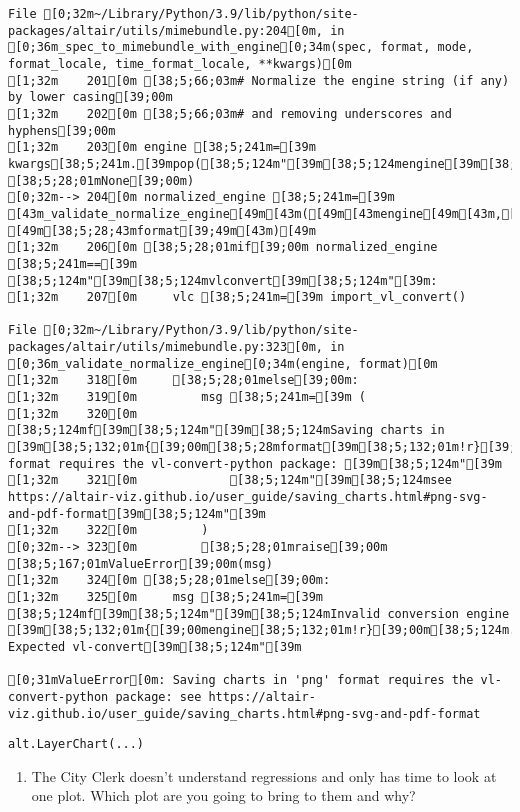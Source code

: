 \documentclass[
  letterpaper,
  DIV=11,
  numbers=noendperiod]{scrartcl}
\providecommand{\tightlist}{%
  \setlength{\itemsep}{0pt}\setlength{\parskip}{0pt}}\usepackage{longtable,booktabs,array}
\begin{document}
\begin{verbatim}
File [0;32m~/Library/Python/3.9/lib/python/site-packages/altair/utils/mimebundle.py:204[0m, in [0;36m_spec_to_mimebundle_with_engine[0;34m(spec, format, mode, format_locale, time_format_locale, **kwargs)[0m
[1;32m    201[0m [38;5;66;03m# Normalize the engine string (if any) by lower casing[39;00m
[1;32m    202[0m [38;5;66;03m# and removing underscores and hyphens[39;00m
[1;32m    203[0m engine [38;5;241m=[39m kwargs[38;5;241m.[39mpop([38;5;124m"[39m[38;5;124mengine[39m[38;5;124m"[39m, [38;5;28;01mNone[39;00m)
[0;32m--> 204[0m normalized_engine [38;5;241m=[39m [43m_validate_normalize_engine[49m[43m([49m[43mengine[49m[43m,[49m[43m [49m[38;5;28;43mformat[39;49m[43m)[49m
[1;32m    206[0m [38;5;28;01mif[39;00m normalized_engine [38;5;241m==[39m [38;5;124m"[39m[38;5;124mvlconvert[39m[38;5;124m"[39m:
[1;32m    207[0m     vlc [38;5;241m=[39m import_vl_convert()

File [0;32m~/Library/Python/3.9/lib/python/site-packages/altair/utils/mimebundle.py:323[0m, in [0;36m_validate_normalize_engine[0;34m(engine, format)[0m
[1;32m    318[0m     [38;5;28;01melse[39;00m:
[1;32m    319[0m         msg [38;5;241m=[39m (
[1;32m    320[0m             [38;5;124mf[39m[38;5;124m"[39m[38;5;124mSaving charts in [39m[38;5;132;01m{[39;00m[38;5;28mformat[39m[38;5;132;01m!r}[39;00m[38;5;124m format requires the vl-convert-python package: [39m[38;5;124m"[39m
[1;32m    321[0m             [38;5;124m"[39m[38;5;124msee https://altair-viz.github.io/user_guide/saving_charts.html#png-svg-and-pdf-format[39m[38;5;124m"[39m
[1;32m    322[0m         )
[0;32m--> 323[0m         [38;5;28;01mraise[39;00m [38;5;167;01mValueError[39;00m(msg)
[1;32m    324[0m [38;5;28;01melse[39;00m:
[1;32m    325[0m     msg [38;5;241m=[39m [38;5;124mf[39m[38;5;124m"[39m[38;5;124mInvalid conversion engine [39m[38;5;132;01m{[39;00mengine[38;5;132;01m!r}[39;00m[38;5;124m. Expected vl-convert[39m[38;5;124m"[39m

[0;31mValueError[0m: Saving charts in 'png' format requires the vl-convert-python package: see https://altair-viz.github.io/user_guide/saving_charts.html#png-svg-and-pdf-format
\end{verbatim}

\begin{verbatim}
alt.LayerChart(...)
\end{verbatim}

\begin{enumerate}
\def\labelenumi{\arabic{enumi}.}
\setcounter{enumi}{2}
\tightlist
\item
  The City Clerk doesn't understand regressions and only has time to
  look at one plot. Which plot are you going to bring to them and why?
\end{enumerate}
\end{document}
